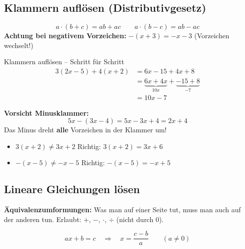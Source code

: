 \documentclass[12pt, a4paper]{article}
\begin{document}
\subsection{Klammern aufl\"osen (Distributivgesetz)}

\begin{formulabox}
\[
  \boxed{a \cdot (b + c) = ab + ac} \qquad \boxed{a \cdot (b - c) = ab - ac}
\]
\textbf{Achtung bei negativem Vorzeichen:} $-(x+3) = -x - 3$ \quad (Vorzeichen wechselt!)
\end{formulabox}

\begin{examplebox}{Klammern aufl\"osen -- Schritt f\"ur Schritt}
\begin{align*}
  3(2x - 5) + 4(x + 2) &= 6x - 15 + 4x + 8 \\
                        &= \underbrace{6x + 4x}_{10x} + \underbrace{-15 + 8}_{-7} \\
                        &= 10x - 7
\end{align*}

\vspace{0.3cm}
\textbf{Vorsicht Minusklammer:}
\[
  5x - (3x - 4) = 5x - 3x + 4 = 2x + 4
\]
Das Minus dreht \textbf{alle} Vorzeichen in der Klammer um!
\end{examplebox}

\begin{fehlerbox}
\begin{itemize}
  \item $3(x + 2) \neq 3x + 2$ \quad Richtig: $3(x+2) = 3x + 6$
  \item $-(x - 5) \neq -x - 5$ \quad Richtig: $-(x-5) = -x + 5$
\end{itemize}
\end{fehlerbox}

\subsection{Lineare Gleichungen l\"osen}

\begin{merkbox}
  \textbf{\"Aquivalenzumformungen:} Was man auf einer Seite tut,
  muss man auch auf der anderen tun. Erlaubt: $+$, $-$, $\cdot$, $\div$ (nicht durch 0).
\end{merkbox}

\begin{formulabox}
\[
  \boxed{ax + b = c \quad\Longrightarrow\quad x = \frac{c-b}{a}} \qquad (a \neq 0)
\]
\end{formulabox}
\end{document}
